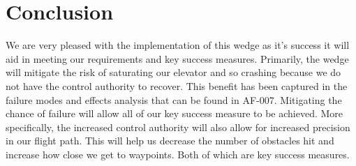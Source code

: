 \documentclass[]{auvsi_doc}
\begin{document}
\section{Conclusion}

We are very pleased with the implementation of this wedge as it's success it will aid in meeting our requirements and key success measures. Primarily, the wedge will mitigate the risk of saturating our elevator and so crashing because we do not have the control authority to recover. This benefit has been captured in the failure modes and effects analysis that can be found in AF-007. Mitigating the chance of failure will allow all of our key success measure to be achieved. More specifically, the increased control authority will also allow for increased precision in our flight path. This will help us decrease the number of obstacles hit and increase how close we get to waypoints. Both of which are key success measures.
\end{document}
